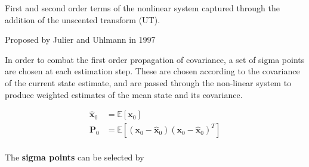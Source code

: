 First and second order terms of the nonlinear system captured through the
addition of the unscented transform (UT).

Proposed by Julier and Uhlmann in 1997 \cite{Julier1997}

\cite{Wan2000, Wan2001}
In order to combat the first order propagation of covariance, a set of sigma
points are chosen at each estimation step. These are chosen according to the
covariance of the current state estimate, and are passed through the non-linear
system to produce weighted estimates of the mean state and its covariance.

\begin{equation}
    \begin{aligned}
        \hat{\bm{x}}_0 &= \mathbb{E}[\bm{x}_0]                                             \\
        \bm{P}_0       &= \mathbb{E}[(\bm{x}_0-\hat{\bm{x}}_0)(\bm{x}_0-\hat{\bm{x}}_0)^T] \\
    \end{aligned}
\end{equation}

\cite{Cheng2011}
The \textbf{sigma points} can be selected by

